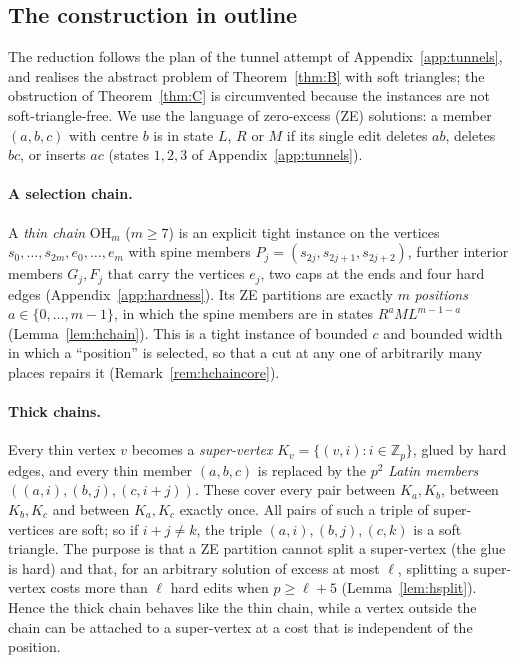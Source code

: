 \subsection{The construction in outline}
The reduction follows the plan of the tunnel attempt of Appendix~\ref{app:tunnels}, and realises the abstract problem of Theorem~\ref{thm:B} with soft triangles; the obstruction of Theorem~\ref{thm:C} is circumvented because the instances are not soft-triangle-free. We use the language of zero-excess (ZE) solutions: a member $(a,b,c)$ with centre $b$ is in state $L$, $R$ or $M$ if its single edit deletes $ab$, deletes $bc$, or inserts $ac$ (states $1,2,3$ of Appendix~\ref{app:tunnels}).

\paragraph{A selection chain.} A \emph{thin chain} $\mathrm{OH}_m$ ($m\ge7$) is an explicit tight instance on the vertices $s_0,\dots,s_{2m},e_0,\dots,e_m$ with spine members $P_j=(s_{2j},s_{2j+1},s_{2j+2})$, further interior members $G_j,F_j$ that carry the vertices $e_j$, two caps at the ends and four hard edges (Appendix~\ref{app:hardness}). Its ZE partitions are exactly $m$ \emph{positions} $a\in\{0,\dots,m-1\}$, in which the spine members are in states $R^{a}ML^{m-1-a}$ (Lemma~\ref{lem:hchain}). This is a tight instance of bounded $c$ and bounded width in which a ``position'' is selected, so that a cut at any one of arbitrarily many places repairs it (Remark~\ref{rem:hchaincore}).

\paragraph{Thick chains.} Every thin vertex $v$ becomes a \emph{super-vertex} $K_v=\{(v,i):i\in\mathbb Z_p\}$, glued by hard edges, and every thin member $(a,b,c)$ is replaced by the $p^2$ \emph{Latin members} $((a,i),(b,j),(c,i+j))$. These cover every pair between $K_a,K_b$, between $K_b,K_c$ and between $K_a,K_c$ exactly once. All pairs of such a triple of super-vertices are soft; so if $i+j\ne k$, the triple $(a,i),(b,j),(c,k)$ is a soft triangle. The purpose is that a ZE partition cannot split a super-vertex (the glue is hard) and that, for an arbitrary solution of excess at most $\ell$, splitting a super-vertex costs more than $\ell$ hard edits when $p\ge\ell+5$ (Lemma~\ref{lem:hsplit}). Hence the thick chain behaves like the thin chain, while a vertex outside the chain can be attached to a super-vertex at a cost that is independent of the position.

